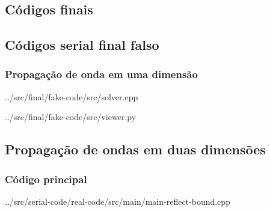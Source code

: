 \begin{appendices}
\chapter{Códigos finais}
\section{Códigos serial final falso}
\subsection{Propagação de onda em uma dimensão}

{../src/final/fake-code/src/solver.cpp}


{../src/final/fake-code/src/viewer.py}

\section{Propagação de ondas em duas dimensões}
\subsection{Código principal}

{../src/serial-code/real-code/src/main/main-reflect-bound.cpp}

\end{appendices}